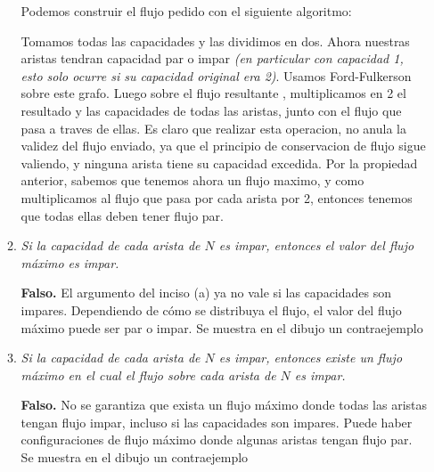 \documentclass{article}
\begin{document}
\begin{enumerate}
\begin{enumerate}
        Podemos construir el flujo pedido con el siguiente algoritmo: 
        
        Tomamos todas las capacidades y las dividimos en dos. Ahora nuestras aristas tendran capacidad par o impar \textit{(en particular  con capacidad 1, esto solo ocurre si su capacidad original era 2)}. Usamos Ford-Fulkerson sobre este grafo. Luego sobre el flujo resultante , multiplicamos en 2 el resultado y las capacidades de todas las aristas, junto con el flujo que pasa a traves de ellas. Es claro que realizar esta operacion, no anula la validez del flujo enviado, ya que el principio de conservacion de flujo sigue valiendo, y ninguna arista tiene su capacidad excedida. Por la propiedad anterior, sabemos que tenemos ahora un flujo maximo, y como multiplicamos al flujo que pasa por cada arista por 2, entonces tenemos que todas ellas deben tener flujo par.
        
      
        \item \textit{Si la capacidad de cada arista de \( N \) es impar, entonces el valor del flujo máximo es impar.}
        
        \textbf{Falso.} El argumento del inciso (a) ya no vale si las capacidades son impares. Dependiendo de cómo se distribuya el flujo, el valor del flujo máximo puede ser par o impar. Se muestra en el dibujo un contraejemplo
        
        \item \textit{Si la capacidad de cada arista de \( N \) es impar, entonces existe un flujo máximo en el cual el flujo sobre cada arista de \( N \) es impar.}
        
        \textbf{Falso.} No se garantiza que exista un flujo máximo donde todas las aristas tengan flujo impar, incluso si las capacidades son impares. Puede haber configuraciones de flujo máximo donde algunas aristas tengan flujo par. Se muestra en el dibujo un contraejemplo
   

\begin{figure}[ht]
    \centering
\end{figure}
\end{enumerate}
\end{enumerate}
\end{document}
